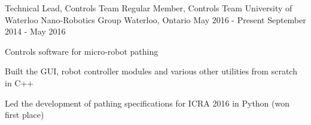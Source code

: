 \begin{cventries}

\cventry
{Technical Lead, Controls Team \newline {\vspace{-.75mm}}
Regular Member, Controls Team}
{University of Waterloo Nano-Robotics Group}
{Waterloo, Ontario}
{May 2016 - Present \newline {\vspace{-1mm}}
September 2014 - May 2016} %
{ %
Controls software for micro-robot pathing
\begin{cvitems}
\item[]
\item {Built the GUI, robot controller modules and various other utilities from scratch in C++}
\item {Led the development of pathing specifications for ICRA 2016 in Python (won first place)}
\end{cvitems} 
}


\end{cventries}

